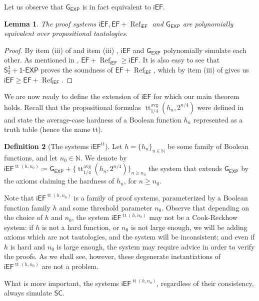 \documentclass[11pt]{article}
\newcommand{\SOTEXP}{\mathsf{S^1_2} + \mathsf{1\textsf{-}EXP}}
\newcommand{\EF}{\mathsf{EF}}
\newcommand{\iEF}{\mathsf{iEF}}
\renewcommand{\SC}{\mathsf{SC}}
\def\GE{\mathsf{G_{EXP}}}
\theoremstyle{definition}
\newtheorem{definition}{Definition}[section]
\theoremstyle{plain}
\newtheorem{lemma}[definition]{Lemma}
\theoremstyle{remark}
\DeclareMathOperator*{\ttt}{tt}
\newcommand{\bbN}{\mathbb{N}}
\begin{document}
Let us observe that $\GE$ is in fact equivalent to $\iEF$.

\begin{lemma}
\label{lemma:systems-equivalent}
    The proof systems $\iEF,\EF + \operatorname{Ref}_{\iEF}$ and $\GE$ are polynomially equivalent over propositional tautologies.
\end{lemma}
\begin{proof}
    By item (iii) of  and item (iii) , $\iEF$ and $\GE$ polynomially simulate each other. As mentioned in , $\EF + \operatorname{Ref}_{\iEF}\geq \iEF$. It is also easy to see that $\SOTEXP$ proves the soundness of $\EF + \operatorname{Ref}_{\iEF}$, which by item (iii) of  gives us $\iEF\geq \EF + \operatorname{Ref}_{\iEF}$.
\end{proof}

We are now ready to define the extension of $\iEF$ for which our main theorem holds. Recall that the propositional formulas $\ttt^{\text{avg}}_{1/4}(h_n,2^{n/4})$ were defined in  and state the average-case hardness of a Boolean function $h_n$ represented as a truth table (hence the name tt).

\begin{definition}[The systems $\iEF^{\operatorname{tt}}$]
\label{def:iEF-tt}
Let $h = \{ h_n \}_{n \in \bbN}$ be some family of Boolean functions, and let $n_0 \in \bbN$. We denote by $\iEF^{\operatorname{tt}(h, n_0)} \coloneqq \GE + \{\ttt^{\text{avg}}_{1/4}(h_n,2^{n/4})\}_{n \geq n_0}$ the system that extends $\GE$ by the axioms claiming the hardness of $h_n$, for $n\ge n_0$.
\end{definition}

Note that $\iEF^{\operatorname{tt}(h, n_0)}$ is a family of proof systems, parameterized by a Boolean function family $h$ and some threshold parameter $n_0$. Observe that depending on the choice of $h$ and $n_0$, the  system $\iEF^{\operatorname{tt}(h, n_0)}$ may not be a Cook-Reckhow system: if $h$ is not a hard function, or $n_0$ is not large enough, we will be adding axioms which are not tautologies, and the system will be inconsistent; and even if $h$ is hard and $n_0$ is large enough, the system may require advice in order to verify the proofs. As we shall see, however, these degenerate instantiations of $\iEF^{\operatorname{tt}(h, n_0)}$ are not a problem.

What is more important, the systems $\iEF^{\operatorname{tt}(h, n_0)}$, regardless of their consistency, always simulate $\SC$.
\end{document}
